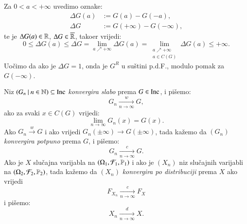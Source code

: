 Za $0 < a < +\infty$ uvedimo oznake:
\begin{equation*}
        \begin{aligned}
            \Delta G(a) &:= G(a) - G(-a),\\
            \Delta G &:= G(+\infty) - G(-\infty),
        \end{aligned}
\end{equation*}
te je $\Delta G(a) \in \mathbb{R}$, $\Delta G \in \overline{\mathbb{R}}$, tako\dj er vrijedi:
\begin{equation}    \label{jed:16.4}
    0 \leq \Delta G(a) \leq \Delta G = \lim\limits_{a \nearrow +\infty} \Delta G (a) = \lim\limits_{
        \begin{smallmatrix}
            a \nearrow +\infty\\
            a \in C(G)
        \end{smallmatrix}
    } \Delta G (a) \leq +\infty.
\end{equation}
Uo\v cimo da ako je $\Delta G = 1$, onda je $G^R$ u su\v stini p.d.F., modulo pomak za $G(-\infty)$.

\begin{defn}    \label{defn:16.5}
    Niz $({G_n} \: | \: {n \in \mathbb{N}}) \subseteq \mathrm{Inc}$ \emph{konvergira slabo} prema $G \in \mathrm{Inc}$, i pi\v semo:
    \begin{equation*}
        G_n \xrightarrow[n \to \infty]{w} G,
    \end{equation*}
    ako za svaki $x \in C(G)$ vrijedi:
    \begin{equation*}
        \lim\limits_{n \to \infty} G_n(x) = G(x).
    \end{equation*}
    Ako $G_n \xrightarrow{w} G$ i ako vrijedi $G_n (\pm \infty) \xrightarrow{} G(\pm \infty)$, tada ka\v zemo da $(G_n)$ \emph{konvergira potpuno} prema $G$, i pi\v semo:
    \begin{equation*}
        G_n \xrightarrow[n \to \infty]{c} G.
    \end{equation*}
    Ako je $X$ slu\v cajna varijabla na $(\Omega_1, \mathcal{F}_1, \mathbb{P}_1)$ i ako je $(X_n)$ niz slu\v cajnih varijabli na $(\Omega_2, \mathcal{F}_2, \mathbb{P}_2)$, tada ka\v zemo da $(X_n)$ \emph{konvergira po distribuciji} prema $X$ ako vrijedi
    \begin{equation*}
        F_{X_n} \xrightarrow[n \to \infty]{c} F_X
    \end{equation*}
    i pi\v semo:
    \begin{equation*}
        X_n \xrightarrow[n \to \infty]{d} X.
    \end{equation*}
\end{defn}

